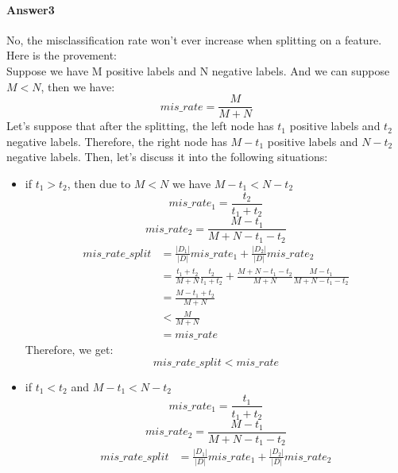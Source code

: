 \documentclass[paper=a4, fontsize=11pt]{scrartcl} %
\numberwithin{equation}{section} %
\numberwithin{figure}{section} %
\numberwithin{table}{section} %
\begin{document}
\paragraph{\textbf{Answer3}}
No, the misclassification rate won't ever increase when splitting on a feature. Here is the provement:
\\ Suppose we have M positive labels and N negative labels. And we can suppose $M < N$, then we have:
\begin{equation*}
mis\_rate=\frac{M}{M+N}
\end{equation*}
Let's suppose that after the splitting, the left node has $t_{1}$ positive labels and $t_{2}$ negative labels. Therefore, the right node has $M-t_{1}$ positive labels and $N-t_{2}$ negative labels. Then, let's discuss it into the following situations:
\begin{itemize}
	\item if $t_{1}>t_{2}$, then due to $M < N$ we have $M-t_{1}<N-t_{2}$
		\begin{equation*}
		mis\_rate_{1}=\frac{t_{2}}{t_{1}+t_{2}}
		\end{equation*}
		\begin{equation*}
		mis\_rate_{2}=\frac{M-t_{1}}{M+N-t_{1}-t_{2}}
		\end{equation*}
		\begin{align*}
		mis\_rate\_split&=\frac{\left | D_{1} \right |}{\left | D \right |}mis\_rate_{1}+\frac{\left | D_{2} \right |}{\left | D \right |}mis\_rate_{2}
		\\ &=\frac{t_{1}+t_{2}}{M+N}\frac{t_{2}}{t_{1}+t_{2}}+\frac{M+N-t_{1}-t_{2}}{M+N}\frac{M-t_{1}}{M+N-t_{1}-t_{2}}
		\\ &=\frac{M-t_{1}+t_{2}}{M+N}
		\\ &<\frac{M}{M+N}
		\\ &=mis\_rate
		\end{align*}
		Therefore, we get:
		\begin{equation*}
		mis\_rate\_split<mis\_rate
		\end{equation*}
	\item if $t_{1}<t_{2}$ and $M-t_{1}<N-t_{2}$
		\begin{equation*}
		mis\_rate_{1}=\frac{t_{1}}{t_{1}+t_{2}}
		\end{equation*}
		\begin{equation*}
		mis\_rate_{2}=\frac{M-t_{1}}{M+N-t_{1}-t_{2}}
		\end{equation*}
		\begin{align*}
		mis\_rate\_split&=\frac{\left | D_{1} \right |}{\left | D \right |}mis\_rate_{1}+\frac{\left | D_{2} \right |}{\left | D \right |}mis\_rate_{2}

\end{align*}
\end{itemize}
\end{document}
